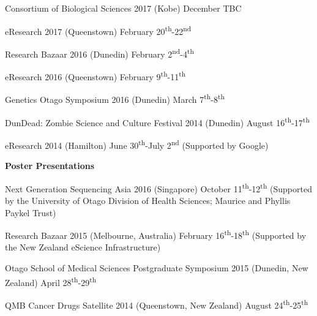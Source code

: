 \begin{small}
Consortium of Biological Sciences 2017 (Kobe) December TBC

eResearch 2017 (Queenstown) February 20\textsuperscript{th}-22\textsuperscript{nd}

Research Bazaar 2016 (Dunedin) February 2\textsuperscript{nd}-4\textsuperscript{th}

eResearch 2016 (Queenstown) February 9\textsuperscript{th}-11\textsuperscript{th}

Genetics Otago Symposium 2016 (Dunedin) March 7\textsuperscript{th}-8\textsuperscript{th} 

DunDead: Zombie Science and Culture Festival 2014 (Dunedin) %
August 16\textsuperscript{th}-17\textsuperscript{th}

eResearch 2014 (Hamilton) %
June 30\textsuperscript{th}-July 2\textsuperscript{nd}
(Supported by Google)

\end{small}

\textbf{Poster Presentations}

\begin{small}
Next Generation Sequencing Asia 2016 (Singapore) October 11\textsuperscript{th}-12\textsuperscript{th}
(Supported by the University of Otago Division of Health Sciences; Maurice and Phyllis Paykel Trust)

Research Bazaar 2015 (Melbourne, Australia) February 16\textsuperscript{th}-18\textsuperscript{th}
(Supported by the New Zealand eScience Infrastructure)

Otago School of Medical Sciences Postgraduate Symposium 2015 (Dunedin, New Zealand) April 28\textsuperscript{th}-29\textsuperscript{th}

QMB Cancer Drugs Satellite 2014 (Queenstown, New Zealand) August 24\textsuperscript{th}-25\textsuperscript{th}

\end{small}

